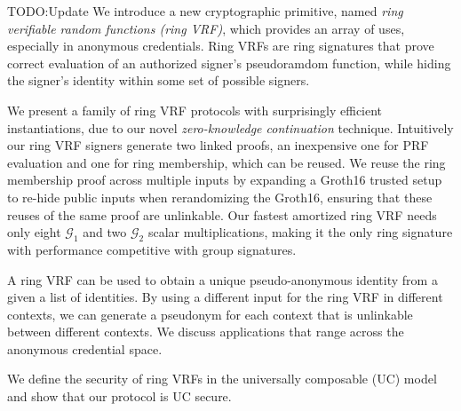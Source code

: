 TODO:Update
\def\eprintsmallskip{\smallskip}{}%
We introduce a new cryptographic primitive, named
 \emph{ring verifiable random functions (ring VRF)},
 which provides an array of uses, especially in anonymous credentials.
Ring VRFs are ring signatures that prove correct evaluation
of an authorized signer's pseudoramdom function, while hiding the signer's
identity within some set of possible signers.

We present a family of ring VRF protocols with surprisingly efficient
instantiations, due to our novel {\em zero-knowledge continuation} technique.
Intuitively our ring VRF signers generate two linked proofs, an inexpensive
 one for PRF evaluation and one for ring membership, which can be reused. 
We reuse the ring membership proof across multiple inputs
by expanding a Groth16 trusted setup to re-hide public inputs when
 rerandomizing the Groth16, ensuring that these reuses of the same proof are unlinkable.
Our fastest amortized ring VRF needs only eight $\mathcal{G}_1$
 and two $\mathcal{G}_2$ scalar multiplications, 
making it the only ring signature with performance competitive with group signatures.

\eprintsmallskip

A ring VRF can be used to obtain a unique pseudo-anonymous identity from a given a list of identities.
By using a different input for the ring VRF in different contexts, we can generate a pseudonym for each context that is unlinkable between different contexts. We discuss applications that range across the anonymous credential space.



\eprintsmallskip
We define the security of ring VRFs in the universally composable (UC) model and show that our protocol is UC secure.
